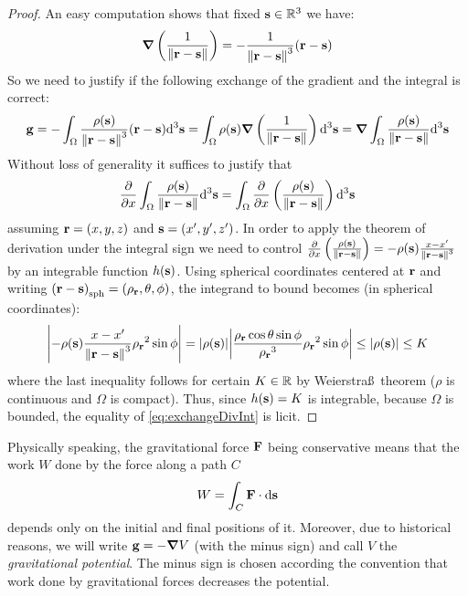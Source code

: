 \documentclass[../main.tex]{subfiles}
\begin{document}
\begin{proof}
  An easy computation shows that fixed $\boldsymbol{\mathrm{s}}\in\mathbb{R}^3$ we have:
  \begin{equation}
    \grad\left(\frac{1}{\left\|\boldsymbol{\mathrm{r}}-\boldsymbol{\mathrm{s}}\right\|}\right)=-\frac{1}{\left\|\boldsymbol{\mathrm{r}}-\boldsymbol{\mathrm{s}}\right\|^3}(\boldsymbol{\mathrm{r}}-\boldsymbol{\mathrm{s}})
  \end{equation}
  So we need to justify if the following exchange of the gradient and the integral is correct:
  \begin{equation}
    \boldsymbol{\mathrm{g}}=-\int_{\Omega}\frac{\rho(\boldsymbol{\mathrm{s}})}{\left\|\boldsymbol{\mathrm{r}}-\boldsymbol{\mathrm{s}}\right\|^3}(\boldsymbol{\mathrm{r}}-\boldsymbol{\mathrm{s}})\dd^3{\boldsymbol{\mathrm{s}}}=\int_{\Omega}\rho(\boldsymbol{\mathrm{s}})\grad\left(\frac{1}{\left\|\boldsymbol{\mathrm{r}}-\boldsymbol{\mathrm{s}}\right\|}\right)\dd^3{\boldsymbol{\mathrm{s}}}=\grad\int_{\Omega}\frac{\rho(\boldsymbol{\mathrm{s}})}{\left\|\boldsymbol{\mathrm{r}}-\boldsymbol{\mathrm{s}}\right\|}\dd^3{\boldsymbol{\mathrm{s}}}
  \end{equation}
  Without loss of generality it suffices to justify that
  \begin{equation}\label{eq:exchangeDivInt}
    \pdv{}{x}\int_{\Omega}\frac{\rho(\boldsymbol{\mathrm{s}})}{\left\|\boldsymbol{\mathrm{r}}-\boldsymbol{\mathrm{s}}\right\|}\dd^3{\boldsymbol{\mathrm{s}}}=\int_{\Omega}\pdv{}{x}\left(\frac{\rho(\boldsymbol{\mathrm{s}})}{\left\|\boldsymbol{\mathrm{r}}-\boldsymbol{\mathrm{s}}\right\|}\right)\dd^3{\boldsymbol{\mathrm{s}}}
  \end{equation}
  assuming $\boldsymbol{\mathrm{r}}=(x,y,z)$ and $\boldsymbol{\mathrm{s}}=(x',y',z')$. In order to apply the theorem of derivation under the integral sign we need to control $\pdv{}{x}\left(\frac{\rho(\boldsymbol{\mathrm{s}})}{\left\|\boldsymbol{\mathrm{r}}-\boldsymbol{\mathrm{s}}\right\|}\right)=-\rho(\boldsymbol{\mathrm{s}})\frac{x-x'}{\left\|\boldsymbol{\mathrm{r}}-\boldsymbol{\mathrm{s}}\right\|^3}$ by an integrable function $h(\boldsymbol{\mathrm{s}})$. Using spherical coordinates centered at $\boldsymbol{\mathrm{r}}$ and writing ${(\boldsymbol{\mathrm{r}}-\boldsymbol{\mathrm{s}})}_{\mathrm{sph}}=(\rho_{\boldsymbol{\mathrm{r}}},\theta,\phi)$, the integrand to bound becomes (in spherical coordinates):
  \begin{equation}
    \abs{-\rho(\boldsymbol{\mathrm{s}})\frac{x-x'}{\left\|\boldsymbol{\mathrm{r}}-\boldsymbol{\mathrm{s}}\right\|^3}{\rho_{\boldsymbol{\mathrm{r}}}}^2\sin\phi}=\abs{\rho(\boldsymbol{\mathrm{s}})}\abs{\frac{{\rho_{\boldsymbol{\mathrm{r}}}}\cos\theta\sin\phi}{{\rho_{\boldsymbol{\mathrm{r}}}}^3}{\rho_{\boldsymbol{\mathrm{r}}}}^2\sin\phi}\leq \abs{\rho(\boldsymbol{\mathrm{s}})}\leq K
  \end{equation}
  where the last inequality follows for certain $K\in\mathbb{R}$ by Weierstra\ss\ theorem ($\rho$ is continuous and $\Omega$ is compact). Thus, since $h(\boldsymbol{\mathrm{s}})=K$ is integrable, because $\Omega$ is bounded, the equality of \cref{eq:exchangeDivInt} is licit.
\end{proof}
Physically speaking, the gravitational force $\boldsymbol{\mathrm{F}}$ being conservative means that the work $W$ done by the force along a path $C$
\begin{equation}
  W=\int_C\boldsymbol{\mathrm{F}}\cdot\dd{\boldsymbol{\mathrm{s}}}
\end{equation}
depends only on the initial and final positions of it. Moreover, due to historical reasons, we will write $\boldsymbol{\mathrm{g}}=-\grad V$ (with the minus sign) and call $V$ the \emph{gravitational potential}. The minus sign is chosen according the convention that work done by gravitational forces decreases the potential.
\end{document}
